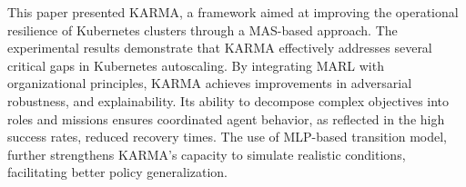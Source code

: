\documentclass[conference]{IEEEtran}
\begin{document}
This paper presented KARMA, a framework aimed at improving the operational resilience of Kubernetes clusters through a MAS-based approach.
The experimental results demonstrate that KARMA effectively addresses several critical gaps in Kubernetes autoscaling. By integrating MARL with organizational principles, KARMA achieves improvements in adversarial robustness, and explainability. Its ability to decompose complex objectives into roles and missions ensures coordinated agent behavior, as reflected in the high success rates, reduced recovery times. The use of MLP-based transition model, further strengthens KARMA's capacity to simulate realistic conditions, facilitating better policy generalization.
%
%
\end{document}
